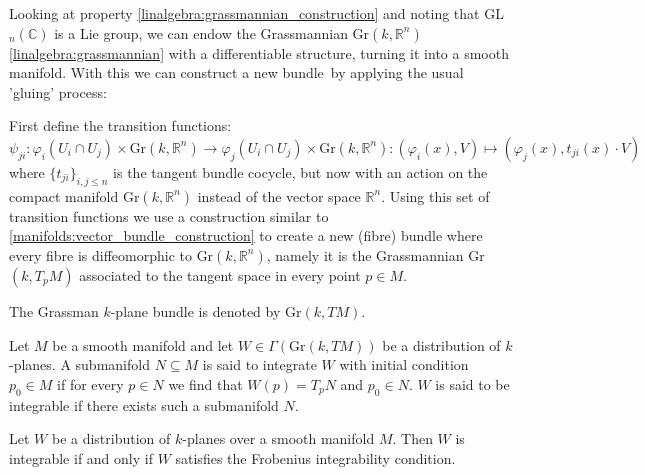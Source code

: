 	Looking at property \ref{linalgebra:grassmannian_construction} and noting that GL$_n(\mathbb{C})$ is a Lie group, we can endow the Grassmannian Gr$(k, \mathbb{R}^n)$ \ref{linalgebra:grassmannian} with a differentiable structure, turning it into a smooth manifold. With this we can construct a new bundle\footnotemark\ by applying the usual 'gluing' process:
	
	\begin{construct}
		First define the transition functions:
		\begin{equation}
			\psi_{ji}:\varphi_i(U_i\cap U_j)\times \text{Gr}(k, \mathbb{R}^n) \rightarrow \varphi_j(U_i\cap U_j)\times \text{Gr}(k, \mathbb{R}^n):(\varphi_i(x), V)\mapsto(\varphi_j(x), t_{ji}(x)\cdot V)
		\end{equation}
		where $\{t_{ji}\}_{i, j\leq n}$ is the tangent bundle cocycle, but now with an action on the compact manifold Gr$(k, \mathbb{R}^n)$ instead of the vector space $\mathbb{R}^n$. Using this set of transition functions we use a construction similar to \ref{manifolds:vector_bundle_construction} to create a new (fibre) bundle where every fibre is diffeomorphic to Gr$(k, \mathbb{R}^n)$, namely it is the Grassmannian Gr$(k, T_pM)$ associated to the tangent space in every point $p\in M$.
	\end{construct}
	\begin{notation}
		The Grassman $k$-plane bundle is denoted by Gr$(k, TM)$.
	\end{notation}
	
	
	\begin{definition}[Integrable]
		Let $M$ be a smooth manifold and let $W\in\Gamma(\text{Gr}(k, TM))$ be a distribution of $k$-planes. A submanifold $N\subseteq M$ is said to integrate $W$ with initial condition $p_0\in M$ if for every $p\in N$ we find that $W(p) = T_pN$ and $p_0\in N$. $W$ is said to be integrable if there exists such a submanifold $N$.
	\end{definition}
	
	\begin{theorem}\label{manifolds:frobenius}
		Let $W$ be a distribution of $k$-planes over a smooth manifold $M$. Then $W$ is integrable if and only if $W$ satisfies the Frobenius integrability condition.
	\end{theorem}

